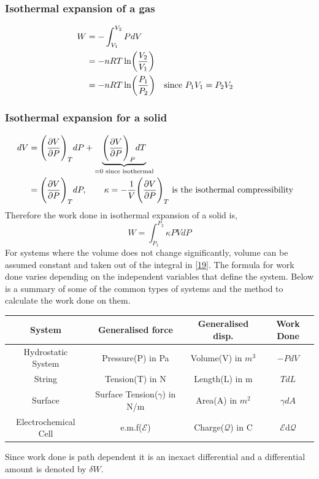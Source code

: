 \documentclass[12pt]{article}
\begin{document}
    \subsubsection{Isothermal expansion of a gas}
   \begin{align}
   	W&=-\int_{V_1}^{V_2}PdV \\
   	 &=-nRT\ln(\frac{V_2}{V_1}) \\
   	 &=-nRT\ln(\frac{P_1}{P_2}) \qq{since $P_1 V_1=P_2 V_2$}
   \end{align}
   
   \subsubsection{Isothermal expansion for a solid}
   \begin{align}
   	dV&=\Bigg(\pdv{V}{P}\Bigg)_TdP+\underbrace{\Bigg(\pdv{V}{P}\Bigg)_PdT}_\text{=0 since isothermal} \\
   	  &=\Bigg(\pdv{V}{P}\Bigg)_TdP ,\quad \qq{$\kappa=-\frac{1}{V}\Bigg(\pdv{V}{P}\Bigg)_T$ is the isothermal compressibility}
   	\end{align}
   Therefore the work done in isothermal expansion of a solid is,
   \begin{equation}
   	W=\int_{P_1}^{P_2}\kappa PVdP \label{19}
   \end{equation}
   For systems where the volume does not change significantly, volume can be assumed constant and taken out of the integral in \eqref{19}.
   The formula for work done varies depending on the independent variables that define the system. Below is a summary of some of the common types of systems and the method to calculate the work done on them.
   \begin{center}
   	\begin{tabular}{|c | c | c |c |} 
   		\hline
   		System & Generalised force & Generalised disp. & Work Done  \\ [0.5ex] 
   		\hline\hline
   		Hydrostatic System & Pressure(P) in Pa & Volume(V) in $m^3$ & $-PdV$ \\ 
   		\hline
   		String & Tension(T) in N & Length(L) in m & $TdL$\\
   		\hline
   		Surface & Surface Tension($\gamma$) in N/m & Area(A) in $m^2$ & $\gamma dA$ \\
   		\hline
   		Electrochemical Cell & e.m.f($\mathcal{E}$) & Charge($\mathcal{Q}$) in C & $\mathcal{E}$d$\mathcal{Q}$ \\ [1ex]
   		\hline
   	\end{tabular}
   \end{center}
Since work done is path dependent it is an inexact differential and a differential amount is denoted by $\delta W$.
\end{document}
